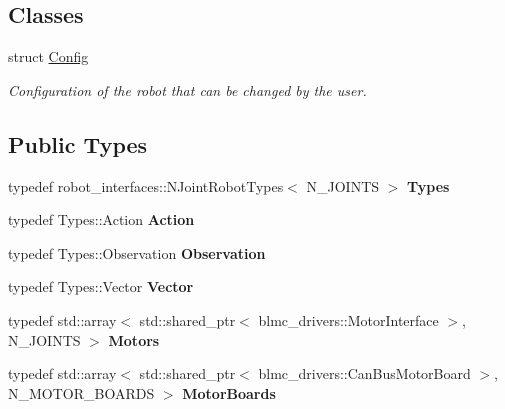 \subsection*{Classes}
\begin{DoxyCompactItemize}
\item 
struct \hyperlink{structblmc__robots_1_1NJointBlmcRobotDriver_1_1Config}{Config}
\begin{DoxyCompactList}\small\item\em Configuration of the robot that can be changed by the user. \end{DoxyCompactList}\end{DoxyCompactItemize}
\subsection*{Public Types}
\begin{DoxyCompactItemize}
\item 
typedef robot\+\_\+interfaces\+::\+N\+Joint\+Robot\+Types$<$ N\+\_\+\+J\+O\+I\+N\+TS $>$ {\bfseries Types}\hypertarget{classblmc__robots_1_1NJointBlmcRobotDriver_a9564734eaa1fe694c12a1ef4a2fdd111}{}\label{classblmc__robots_1_1NJointBlmcRobotDriver_a9564734eaa1fe694c12a1ef4a2fdd111}

\item 
typedef Types\+::\+Action {\bfseries Action}\hypertarget{classblmc__robots_1_1NJointBlmcRobotDriver_a00dd0941134c3f67b8580e96d757a754}{}\label{classblmc__robots_1_1NJointBlmcRobotDriver_a00dd0941134c3f67b8580e96d757a754}

\item 
typedef Types\+::\+Observation {\bfseries Observation}\hypertarget{classblmc__robots_1_1NJointBlmcRobotDriver_ae9276e8ccd8afd265c6eac1907df2c84}{}\label{classblmc__robots_1_1NJointBlmcRobotDriver_ae9276e8ccd8afd265c6eac1907df2c84}

\item 
typedef Types\+::\+Vector {\bfseries Vector}\hypertarget{classblmc__robots_1_1NJointBlmcRobotDriver_a44c2dfe4150dfbce81e50bcfb7e609b1}{}\label{classblmc__robots_1_1NJointBlmcRobotDriver_a44c2dfe4150dfbce81e50bcfb7e609b1}

\item 
typedef std\+::array$<$ std\+::shared\+\_\+ptr$<$ blmc\+\_\+drivers\+::\+Motor\+Interface $>$, N\+\_\+\+J\+O\+I\+N\+TS $>$ {\bfseries Motors}\hypertarget{classblmc__robots_1_1NJointBlmcRobotDriver_a629509d3a20e1dbcba5ccf8ce56f1bfe}{}\label{classblmc__robots_1_1NJointBlmcRobotDriver_a629509d3a20e1dbcba5ccf8ce56f1bfe}

\item 
typedef std\+::array$<$ std\+::shared\+\_\+ptr$<$ blmc\+\_\+drivers\+::\+Can\+Bus\+Motor\+Board $>$, N\+\_\+\+M\+O\+T\+O\+R\+\_\+\+B\+O\+A\+R\+DS $>$ {\bfseries Motor\+Boards}\hypertarget{classblmc__robots_1_1NJointBlmcRobotDriver_af9a1e5d7dae33b324452fba3418a6fcf}{}\label{classblmc__robots_1_1NJointBlmcRobotDriver_af9a1e5d7dae33b324452fba3418a6fcf}

\end{DoxyCompactItemize}
